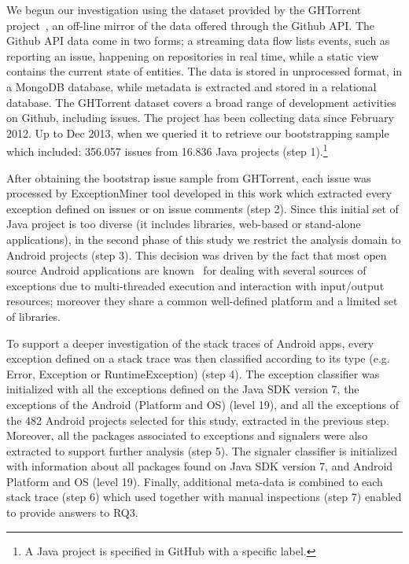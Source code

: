 \documentclass[conference]{IEEEtran}
\begin{document}
We begun our investigation using the dataset provided by the GHTorrent project~\cite{Gousi13}, an off-line mirror of the data offered through the Github API. The Github API data come in two forms; a streaming data flow lists events, such as reporting an issue, happening on repositories in real time, while a static view contains the current state of entities. The data is stored in unprocessed format, in a MongoDB database, while metadata is extracted and stored in a relational database. The GHTorrent dataset covers a broad range of development activities on Github, including issues. The project has been collecting data since February 2012. Up to Dec 2013, when we queried it to retrieve our bootstrapping sample which included: 356.057 issues from 16.836 Java projects (step 1).\footnote{A Java project is specified in GitHub with a specific label.}

After obtaining the bootstrap issue sample from GHTorrent, each issue was processed by ExceptionMiner tool developed in this work which extracted every exception defined on issues or on issue comments (step 2). Since this initial set of Java project is too diverse (it includes libraries, web-based or stand-alone applications), in the second phase of this study we restrict the analysis domain to Android projects (step 3). This decision was driven by the fact that most open source Android applications are known~\cite{ref} for dealing with several sources of exceptions due to multi-threaded execution and interaction with input/output resources; moreover they share a common well-defined platform and a limited set of libraries. 

To support a deeper investigation of the stack traces of Android apps, every exception defined on a stack trace was then classified according to its type (e.g. Error, Exception or RuntimeException) (step 4). The exception classifier was initialized with all the exceptions defined on the Java SDK version 7, the exceptions of the Android (Platform and OS) (level 19), and all the exceptions of the 482 Android projects selected for this study, extracted in the previous step. Moreover, all the packages associated to exceptions and signalers were also extracted to support further analysis (step 5). The signaler classifier is initialized with information about all packages found on Java SDK version 7, and Android Platform and OS (level 19). Finally, additional meta-data is combined to each stack trace (step 6) which used together with manual inspections (step 7) enabled to provide answers to RQ3.
\end{document}
